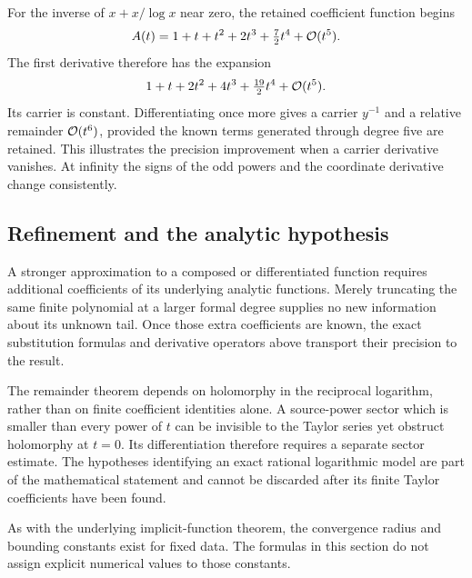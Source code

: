 For the inverse of $x+x/\log x$ near zero, the retained coefficient
function begins
\[
 A(t)=1+t+t^2+2t^3+\tfrac72t^4+\mathcal O(t^5).
\]
The first derivative therefore has the expansion
\[
 1+t+2t^2+4t^3+\tfrac{19}{2}t^4+\mathcal O(t^5).
\]
Its carrier is constant. Differentiating once more gives a carrier $y^{-1}$
and a relative remainder $\mathcal O(t^6)$, provided the known terms generated
through degree five are retained. This illustrates the precision improvement
when a carrier derivative vanishes. At infinity the signs of the odd
powers and the coordinate derivative change consistently.

\subsection{Refinement and the analytic hypothesis}

A stronger approximation to a composed or differentiated function requires
additional coefficients of its underlying analytic functions. Merely
truncating the same finite polynomial at a larger formal degree supplies
no new information about its unknown tail. Once those extra coefficients
are known, the exact substitution formulas and derivative operators above
transport their precision to the result.

The remainder theorem depends on holomorphy in the reciprocal logarithm,
rather than on finite coefficient identities alone. A source-power sector
which is smaller than every power of $t$ can be invisible to the Taylor
series yet obstruct holomorphy at $t=0$. Its differentiation therefore
requires a separate sector estimate. The hypotheses identifying an exact
rational logarithmic model are part of the mathematical statement and
cannot be discarded after its finite Taylor coefficients have been found.

As with the underlying implicit-function theorem, the convergence radius
and bounding constants exist for fixed data. The formulas in this section
do not assign explicit numerical values to those constants.

